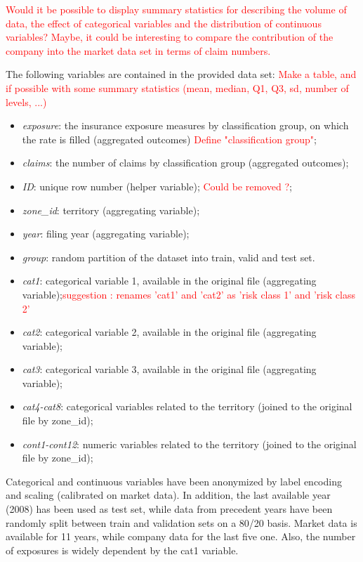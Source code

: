 \documentclass[
]{article}
\providecommand{\tightlist}{%
  \setlength{\itemsep}{0pt}\setlength{\parskip}{0pt}}
\begin{document}
\textcolor{red}{Would it be possible to display summary statistics for describing the volume of data, the effect of categorical variables and the distribution of continuous variables? Maybe, it could be interesting to compare the contribution of the company into the market data set in terms of claim numbers.}

The following variables are contained in the provided data set:
\textcolor{red}{Make a table, and if possible with some summary statistics (mean, median, Q1, Q3, sd, number of levels, ...)}

\begin{itemize}
\tightlist
\item
  \emph{exposure}: the insurance exposure measures by classification
  group, on which the rate is filled (aggregated outcomes)
  \textcolor{red}{Define "classification group"};
\item
  \emph{claims}: the number of claims by classification group
  (aggregated outcomes);
\item
  \emph{ID}: unique row number (helper variable);
  \textcolor{red}{Could be removed ?};
\item
  \emph{zone\_id}: territory (aggregating variable);
\item
  \emph{year}: filing year (aggregating variable);
\item
  \emph{group}: random partition of the dataset into train, valid and
  test set.
\item
  \emph{cat1}: categorical variable 1, available in the original file
  (aggregating
  variable);\textcolor{red}{suggestion : renames 'cat1' and 'cat2' as 'risk class 1' and 'risk class 2'}
\item
  \emph{cat2}: categorical variable 2, available in the original file
  (aggregating variable);
\item
  \emph{cat3}: categorical variable 3, available in the original file
  (aggregating variable);
\item
  \emph{cat4-cat8}: categorical variables related to the territory
  (joined to the original file by zone\_id);
\item
  \emph{cont1-cont12}: numeric variables related to the territory
  (joined to the original file by zone\_id);
\end{itemize}

Categorical and continuous variables have been anonymized by label
encoding and scaling (calibrated on market data). In addition, the last
available year (2008) has been used as test set, while data from
precedent years have been randomly split between train and validation
sets on a 80/20 basis. Market data is available for 11 years, while
company data for the last five one. Also, the number of exposures is
widely dependent by the cat1 variable.
\end{document}
